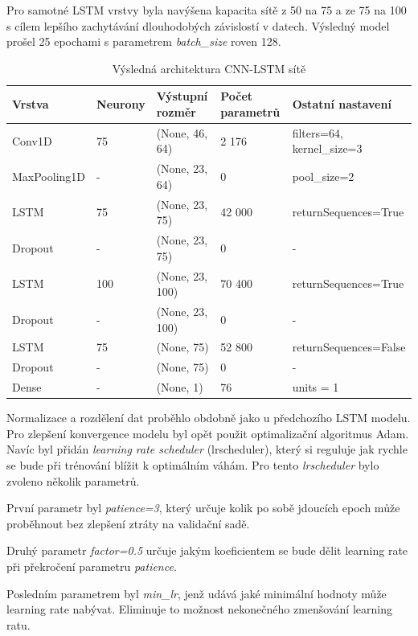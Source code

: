\documentclass[FM,BP,fonts]{tulthesis}
\begin{document}
Pro samotné LSTM vrstvy byla navýšena kapacita sítě z 50 na 75 a ze 75 na 100 s cílem lepšího zachytávání dlouhodobých závislostí v datech. Výsledný model prošel 25 epochami s parametrem \textit{batch\_size} roven 128.

\begin{table}[!ht]
	\centering
	\caption{Výsledná architektura CNN-LSTM sítě}
	
	\begin{tabularx}{\linewidth}{llXXX}
		\hline
		\textbf{Vrstva} & \textbf{Neurony} & \textbf{Výstupní rozměr} & \textbf{Počet parametrů} & \textbf{Ostatní nastavení} \\ \hline
			Conv1D & 75 &  (None, 46, 64)   & 2 176 & filters=64, kernel\_size=3 \\
			MaxPooling1D & - &  (None, 23, 64)   & 0 & pool\_size=2 \\
			LSTM & 75 & (None, 23, 75) &  42 000 & returnSequences=True \\
			Dropout & - & (None, 23, 75) & 0 & - \\
			LSTM  & 100 & (None, 23, 100) & 70 400 & returnSequences=True \\
			Dropout & - & (None, 23, 100) & 0 & - \\
			LSTM   & 75 & (None, 75) & 52 800 & returnSequences=False \\
			Dropout & - & (None, 75) & 0 & - \\
			Dense & - & (None, 1) & 76 & units = 1 \\
	\end{tabularx}
\end{table}

Normalizace a rozdělení dat proběhlo obdobně jako u předchozího LSTM modelu. Pro zlepšení konvergence modelu byl opět použit optimalizační algoritmus Adam. Navíc byl přidán \textit{learning rate scheduler} (lrscheduler), který si reguluje jak rychle se bude při trénování blížit k optimálním váhám. Pro tento \textit{lrscheduler} bylo zvoleno několik parametrů. 

První parametr byl \textit{patience=3}, který určuje kolik po sobě jdoucích epoch může proběhnout bez zlepšení ztráty na validační sadě. 

Druhý parametr \textit{factor=0.5} určuje jakým koeficientem se bude dělit learning rate při překročení parametru \textit{patience}. 

Posledním parametrem byl \textit{min\_lr}, jenž udává jaké minimální hodnoty může learning rate nabývat. Eliminuje to možnost nekonečného zmenšování learning ratu.
\end{document}
